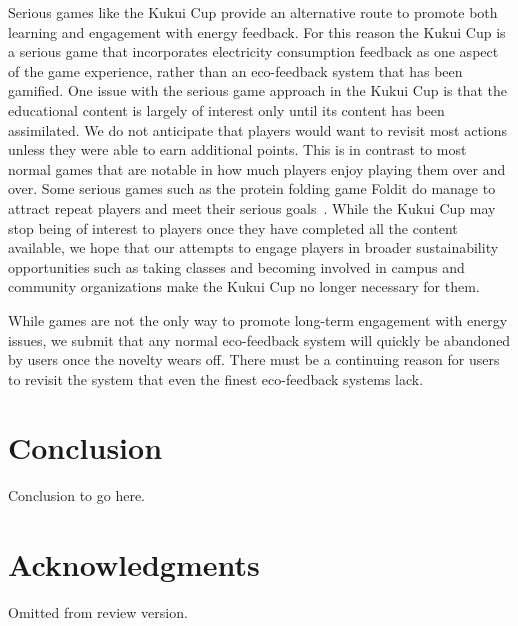 \documentclass{sigchi}
\begin{document}
Serious games like the Kukui Cup provide an alternative route to promote both learning and engagement with energy feedback. For this reason the Kukui Cup is a serious game that incorporates electricity consumption feedback as one aspect of the game experience, rather than an eco-feedback system that has been gamified. One issue with the serious game approach in the Kukui Cup is that the educational content is largely of interest only until its content has been assimilated. We do not anticipate that players would want to revisit most actions unless they were able to earn additional points. This is in contrast to most normal games that are notable in how much players enjoy playing them over and over. Some serious games such as the protein folding game Foldit do manage to attract repeat players and meet their serious goals~\cite{Khatib2011}. While the Kukui Cup may stop being of interest to players once they have completed all the content available, we hope that our attempts to engage players in broader sustainability opportunities such as taking classes and becoming involved in campus and community organizations make the Kukui Cup no longer necessary for them.

While games are not the only way to promote long-term engagement with energy issues, we submit that any normal eco-feedback system will quickly be abandoned by users once the novelty wears off. There must be a continuing reason for users to revisit the system that even the finest eco-feedback systems lack.


\section{Conclusion}

Conclusion to go here.

\section{Acknowledgments}

Omitted from review version.


%
%
%
%
%
\balance



\end{document}

